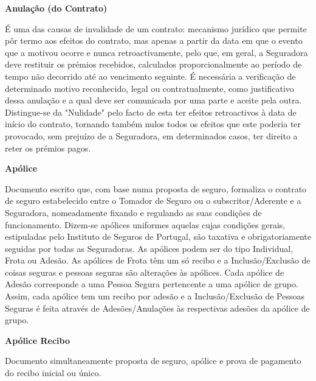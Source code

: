 \begin{description}
\item \textbf{Anulação (do Contrato)}

É uma das causas de invalidade de um contrato: mecanismo jurídico que permite pôr termo aos efeitos do contrato, mas apenas a partir da data em que o evento que a motivou ocorre e nunca retroactivamente, pelo que, em geral, a Seguradora deve restituir os prémios recebidos, calculados proporcionalmente ao período de tempo não decorrido até ao vencimento seguinte. É necessária a verificação de determinado motivo reconhecido, legal ou contratualmente, como justificativo dessa anulação e a qual deve ser comunicada por uma parte e aceite pela outra. Distingue-se da "Nulidade" pelo facto de esta ter efeitos retroactivos à data de início do contrato, tornando também nulos todos os efeitos que este poderia ter provocado, sem prejuízo de a Seguradora, em determinados casos, ter direito a reter os prémios pagos.
\end{description}

\begin{description}
\item \textbf{Apólice}

Documento escrito que, com base numa proposta de seguro, formaliza o contrato de seguro estabelecido entre o Tomador de Seguro ou o subscritor/Aderente e a Seguradora, nomeadamente fixando e regulando as suas condições de funcionamento. Dizem-se apólices uniformes aquelas cujas condições gerais, estipuladas pelo Instituto de Seguros de Portugal, são taxativa e obrigatoriamente seguidas por todas as Seguradoras. As apólices podem ser do tipo Individual, Frota ou Adesão. As apólices de Frota têm um só recibo e a Inclusão/Exclusão de coisas seguras e pessoas seguras são alterações às apólices. Cada apólice de Adesão corresponde a uma Pessoa Segura pertencente a uma apólice de grupo. Assim, cada apólice tem um recibo por adesão e a Inclusão/Exclusão de Pessoas Seguras é feita através de Adesões/Anulações às respectivas adesões da apólice de grupo.\end{description}

\begin{description}
\item \textbf{Apólice Recibo}

Documento simultaneamente proposta de seguro, apólice e prova de pagamento do recibo inicial ou único.
\end{description}

